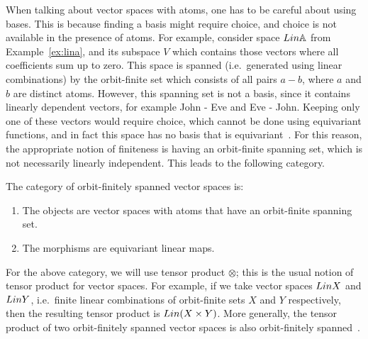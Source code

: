 When talking about vector spaces with atoms, one has to be careful about using bases. This is because finding a basis might require choice, and choice is not available in the presence of atoms. 
For example, consider space $\Lin \atoms$ from Example~\ref{ex:lina}, and its subspace $V$ which contains those vectors where all coefficients sum up to zero. This space is spanned (i.e.~generated using linear combinations) by the orbit-finite set which consists of all pairs $a - b$, where $a$ and $b$ are distinct atoms.
However, this spanning set is not a basis, since it contains linearly dependent vectors, for example John - Eve and Eve - John. Keeping only one of these vectors would require choice, which cannot be done using equivariant functions, and in fact this space has no basis that is equivariant~\cite[Example 6]{bojanczykKM21OrbitFiniteVector}. For this reason, the appropriate notion of finiteness is having an orbit-finite spanning set, which is not necessarily linearly independent. This leads to the following category.

\begin{definition}\label{def:orbit-finite-vector-space-category}
    The category of orbit-finitely spanned vector spaces is:
    \begin{enumerate}
        \item The objects are vector spaces with atoms that have an orbit-finite spanning set.
        \item The morphisms are equivariant linear maps.
    \end{enumerate}
\end{definition}

For the above category, we will use tensor product $\otimes$; this is the usual notion of tensor product for vector spaces. For example, if we take vector spaces $\Lin X$ and $\Lin Y$, i.e.~finite linear combinations of orbit-finite sets $X$ and $Y$ respectively, then the resulting tensor product is $\Lin (X \times Y)$. More generally, the tensor product of two orbit-finitely spanned vector spaces is also orbit-finitely spanned~\cite[Theorem VI.3]{bojanczykKM21OrbitFiniteVector}. 



